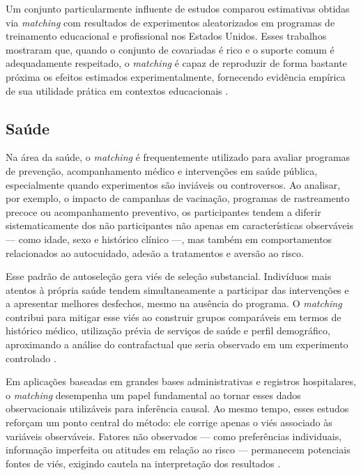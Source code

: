 Um conjunto particularmente influente de estudos comparou estimativas obtidas via \textit{matching} com resultados de experimentos aleatorizados em programas de treinamento educacional e profissional nos Estados Unidos. Esses trabalhos mostraram que, quando o conjunto de covariadas é rico e o suporte comum é adequadamente respeitado, o \textit{matching} é capaz de reproduzir de forma bastante próxima os efeitos estimados experimentalmente, fornecendo evidência empírica de sua utilidade prática em contextos educacionais \citep{dehejia1999causal, dehejia2002propensity}.

\subsection*{Saúde}

Na área da saúde, o \textit{matching} é frequentemente utilizado para avaliar programas de prevenção, acompanhamento médico e intervenções em saúde pública, especialmente quando experimentos são inviáveis ou controversos. Ao analisar, por exemplo, o impacto de campanhas de vacinação, programas de rastreamento precoce ou acompanhamento preventivo, os participantes tendem a diferir sistematicamente dos não participantes não apenas em características observáveis — como idade, sexo e histórico clínico —, mas também em comportamentos relacionados ao autocuidado, adesão a tratamentos e aversão ao risco.

Esse padrão de autoseleção gera viés de seleção substancial. Indivíduos mais atentos à própria saúde tendem simultaneamente a participar das intervenções e a apresentar melhores desfechos, mesmo na ausência do programa. O \textit{matching} contribui para mitigar esse viés ao construir grupos comparáveis em termos de histórico médico, utilização prévia de serviços de saúde e perfil demográfico, aproximando a análise do contrafactual que seria observado em um experimento controlado \citep{stuart2010matching}.

Em aplicações baseadas em grandes bases administrativas e registros hospitalares, o \textit{matching} desempenha um papel fundamental ao tornar esses dados observacionais utilizáveis para inferência causal. Ao mesmo tempo, esses estudos reforçam um ponto central do método: ele corrige apenas o viés associado às variáveis observáveis. Fatores não observados — como preferências individuais, informação imperfeita ou atitudes em relação ao risco — permanecem potenciais fontes de viés, exigindo cautela na interpretação dos resultados \citep{imbens2015causal}.

